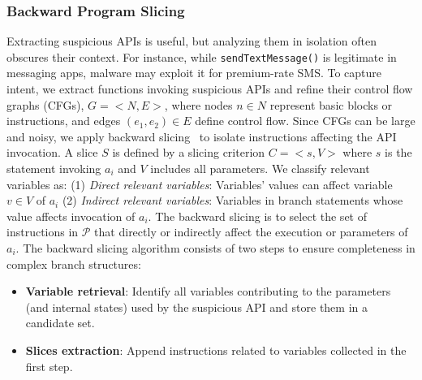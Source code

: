 \subsubsection{Backward Program Slicing}

Extracting suspicious APIs is useful, but analyzing them in isolation often obscures their context. For instance, while \verb|sendTextMessage()| is legitimate in messaging apps, malware may exploit it for premium-rate SMS. To capture intent, we extract functions invoking suspicious APIs and refine their control flow graphs (CFGs), $G = <N, E>$, where nodes $n \in N$ represent basic blocks or instructions, and edges $(e_1, e_2) \in E$ define control flow. Since CFGs can be large and noisy, we apply backward slicing~\cite{slicing} to isolate instructions affecting the API invocation. A slice $S$ is defined by a slicing criterion $C = <s, V>$ where $s$ is the statement invoking $a_i$ and $V$ includes all parameters. We classify relevant variables as: (1) \textit{Direct relevant variables}: Variables' values can affect variable $v \in V$ of $a_i$  (2) \textit{Indirect relevant variables}: Variables in branch statements whose value affects invocation of $a_i$. The backward slicing is to select the set of instructions in $\mathcal{P}$ that directly or indirectly affect the execution or parameters of $a_i$. The backward slicing algorithm consists of two steps to ensure completeness in complex branch structures:
\begin{itemize}
    \item \textbf{Variable retrieval}: Identify all variables contributing to the parameters (and internal states) used by the suspicious API and store them in a candidate set.
    \item \textbf{Slices extraction}: Append instructions related to variables collected in the first step.
\end{itemize}


